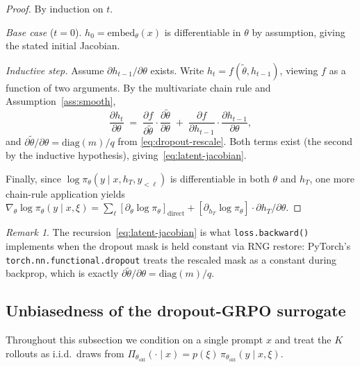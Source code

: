 \documentclass[11pt]{article}
\theoremstyle{definition}
\theoremstyle{remark}
\newtheorem{remark}[theorem]{Remark}
\newcommand{\old}{\mathrm{old}}
\begin{document}
\begin{proof}
By induction on $t$.

\emph{Base case} ($t=0$).  $h_0 = \mathrm{embed}_\theta(x)$ is
differentiable in $\theta$ by assumption, giving the stated initial
Jacobian.

\emph{Inductive step.}  Assume $\partial h_{t-1}/\partial \theta$ exists.
Write $h_t = f(\tilde\theta, h_{t-1})$, viewing $f$ as a function of two
arguments.  By the multivariate chain rule and Assumption~\ref{ass:smooth},
\[
\frac{\partial h_t}{\partial \theta}
  \;=\;
\frac{\partial f}{\partial \tilde\theta}
  \cdot
\frac{\partial \tilde\theta}{\partial \theta}
  \;+\;
\frac{\partial f}{\partial h_{t-1}}
  \cdot
\frac{\partial h_{t-1}}{\partial \theta},
\]
and $\partial \tilde\theta/\partial \theta = \mathrm{diag}(m)/q$ from
\eqref{eq:dropout-rescale}.  Both terms exist (the second by the
inductive hypothesis), giving~\eqref{eq:latent-jacobian}.

Finally, since $\log \pi_\theta(y \mid x, h_T, y_{<\ell})$ is
differentiable in both $\theta$ and $h_T$, one more chain-rule
application yields
$\nabla_\theta \log \pi_\theta(y \mid x, \xi)
   = \sum_\ell [\partial_\theta \log \pi_\theta]_{\text{direct}}
              + [\partial_{h_T}\log \pi_\theta]\cdot \partial h_T/\partial\theta$.
\end{proof}

\begin{remark}
The recursion~\eqref{eq:latent-jacobian} is what \texttt{loss.backward()}
implements when the dropout mask is held constant via RNG restore: PyTorch's
\texttt{torch.nn.functional.dropout} treats the rescaled mask as a constant
during backprop, which is exactly $\partial \tilde\theta/\partial \theta =
\mathrm{diag}(m)/q$.
\end{remark}

\subsection{Unbiasedness of the dropout-GRPO surrogate}
\label{sec:unbiased}

Throughout this subsection we condition on a single prompt $x$ and treat
the $K$ rollouts as i.i.d.\ draws from
$\Pi_{\theta_\old}(\cdot \mid x) = p(\xi)\,\pi_{\theta_\old}(y\mid x,\xi)$.
\end{document}
